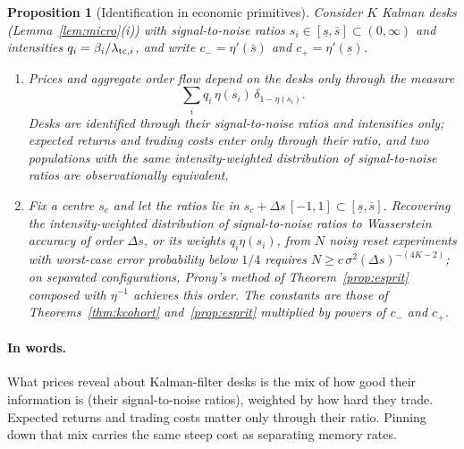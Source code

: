 \documentclass[12pt]{article}
\newtheorem{proposition}[theorem]{Proposition}
\theoremstyle{definition}
\theoremstyle{remark}
\begin{document}
\begin{proposition}[Identification in economic primitives]\label{prop:primitives}
Consider $K$ Kalman desks (Lemma~\ref{lem:micro}(i)) with signal-to-noise ratios $s_i\in[\underline s,\bar s]\subset(0,\infty)$ and intensities $q_i=\beta_i/\lambda_{{\rm tc},i}$, and write $c_-=\eta'(\bar s)$ and $c_+=\eta'(\underline s)$.
\begin{enumerate}[label=(\roman*)]
\item Prices and aggregate order flow depend on the desks only through the measure
\[
\sum_iq_i\,\eta(s_i)\,\delta_{1-\eta(s_i)}.
\]
Desks are identified through their signal-to-noise ratios and intensities only; expected returns and trading costs enter only through their ratio, and two populations with the same intensity-weighted distribution of signal-to-noise ratios are observationally equivalent.
\item Fix a centre $s_c$ and let the ratios lie in $s_c+\Delta s\,[-1,1]\subset[\underline s,\bar s]$. Recovering the intensity-weighted distribution of signal-to-noise ratios to Wasserstein accuracy of order $\Delta s$, or its weights $q_i\eta(s_i)$, from $N$ noisy reset experiments with worst-case error probability below $1/4$ requires $N\ge c\,\sigma^2(\Delta s)^{-(4K-2)}$; on separated configurations, Prony's method of Theorem~\ref{prop:esprit} composed with $\eta^{-1}$ achieves this order. The constants are those of Theorems~\ref{thm:kcohort} and~\ref{prop:esprit} multiplied by powers of $c_-$ and $c_+$.
\end{enumerate}
\end{proposition}

\paragraph{In words.} What prices reveal about Kalman-filter desks is the mix of how good their information is (their signal-to-noise ratios), weighted by how hard they trade. Expected returns and trading costs matter only through their ratio. Pinning down that mix carries the same steep cost as separating memory rates.
\end{document}
